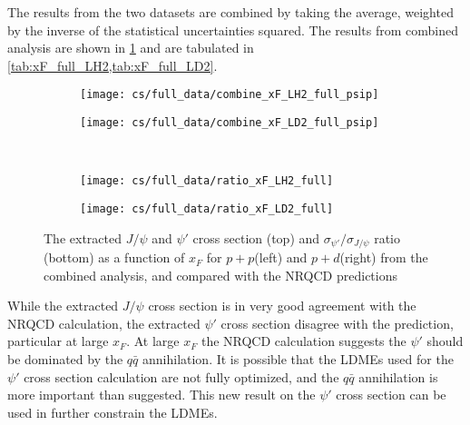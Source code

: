 \documentclass[../main.tex]{subfiles}
\begin{document}
The results from the two datasets are combined by taking the average, weighted by
the inverse of the statistical uncertainties squared.
The results from combined analysis are shown in \cref{fig:cs_xF_full} and are tabulated in
\cref{tab:xF_full_LH2,tab:xF_full_LD2}.
\begin{figure}
	\centering
	\begin{subfigure}{0.45\linewidth}
		\texttt{[image: cs/full\_data/combine\_xF\_LH2\_full\_psip]}
	\end{subfigure}
	\begin{subfigure}{0.45\linewidth}
		\texttt{[image: cs/full\_data/combine\_xF\_LD2\_full\_psip]}
	\end{subfigure}\\
	\begin{subfigure}{0.45\linewidth}
		\texttt{[image: cs/full\_data/ratio\_xF\_LH2\_full]}
	\end{subfigure}
	\begin{subfigure}{0.45\linewidth}
		\texttt{[image: cs/full\_data/ratio\_xF\_LD2\_full]}
	\end{subfigure}
	\caption{The extracted $J/\psi$ and $\psi'$ cross section (top) and $\sigma_{\psi'}/\sigma_{J/\psi}$
		ratio (bottom) as a function of $x_F$ for $p+p$(left) and $p+d$(right) from
		the combined analysis, and compared with the NRQCD predictions}
	\label{fig:cs_xF_full}
\end{figure}
\begin{table}[h!]
	\centering
	\caption{Cross section as a function of $x_F$ (in \unit{\nano\barn\per nucleon}) and the
		$\sigma_{\psi'}/\sigma_{J/\psi}$ ratio for $p+p$ extracted from the combined analysis, with
		their statistical and systematic uncertainties and the average $x_F$ in each bin.}
	
	\label{tab:xF_full_LH2}
\end{table}
\begin{table}[h!]
	\centering
	\caption{Cross section as a function of $x_F$ (in \unit{\nano\barn\per nucleon}) and the
		$\sigma_{\psi'}/\sigma_{J/\psi}$ ratio for $p+d$ extracted from the combined analysis, with
		their statistical and systematic uncertainties and the average $x_F$ in each bin.}
	
	\label{tab:xF_full_LD2}
\end{table}
While the extracted $J/\psi$ cross section is in very good agreement with the NRQCD calculation,
the extracted $\psi'$
cross section disagree with the prediction, particular at large $x_F$. At large $x_F$ the NRQCD
calculation suggests the $\psi'$ should be dominated by the $q\bar{q}$ annihilation.
It is possible that the LDMEs used  for the $\psi'$ cross section calculation are not fully optimized,
and the $q\bar{q}$ annihilation is more important than suggested. This new result on the $\psi'$
cross section can be used in further constrain the LDMEs.
\end{document}
